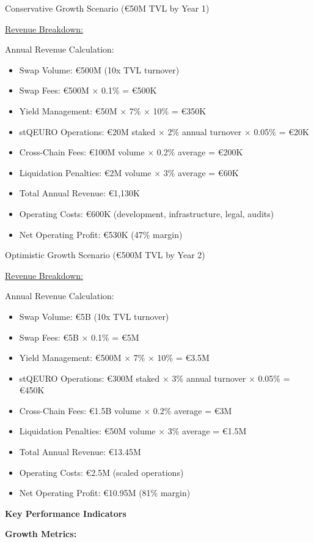 Conservative Growth Scenario (€50M TVL by Year 1)

\ul{Revenue Breakdown:}

Annual Revenue Calculation:

\begin{itemize}
\item
  Swap Volume: €500M (10x TVL turnover)
\item
  Swap Fees: €500M × 0.1\% = €500K
\item
  Yield Management: €50M × 7\% × 10\% = €350K
\item
  stQEURO Operations: €20M staked × 2\% annual turnover × 0.05\% = €20K
\item
  Cross-Chain Fees: €100M volume × 0.2\% average = €200K
\item
  Liquidation Penalties: €2M volume × 3\% average = €60K
\item
  Total Annual Revenue: €1,130K
\item
  Operating Costs: €600K (development, infrastructure, legal, audits)
\item
  Net Operating Profit: €530K (47\% margin)
\end{itemize}

Optimistic Growth Scenario (€500M TVL by Year 2)

\ul{Revenue Breakdown:}

Annual Revenue Calculation:

\begin{itemize}
\item
  Swap Volume: €5B (10x TVL turnover)
\item
  Swap Fees: €5B × 0.1\% = €5M
\item
  Yield Management: €500M × 7\% × 10\% = €3.5M
\item
  stQEURO Operations: €300M staked × 3\% annual turnover × 0.05\% =
  €450K
\item
  Cross-Chain Fees: €1.5B volume × 0.2\% average = €3M
\item
  Liquidation Penalties: €50M volume × 3\% average = €1.5M
\item
  Total Annual Revenue: €13.45M
\item
  Operating Costs: €2.5M (scaled operations)
\item
  Net Operating Profit: €10.95M (81\% margin)
\end{itemize}

\textbf{Key Performance Indicators}

\textbf{Growth Metrics:}

